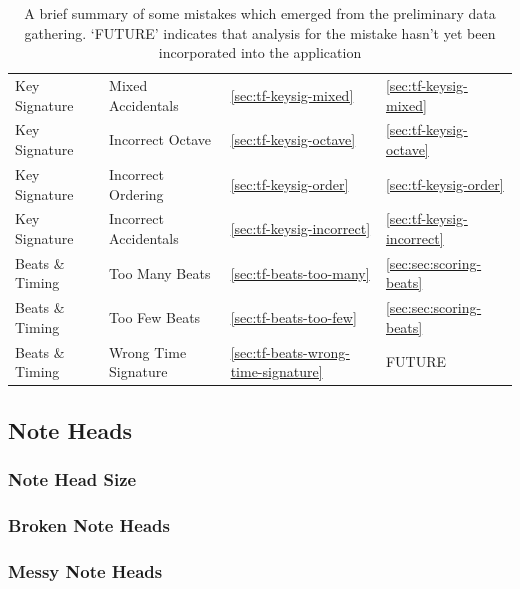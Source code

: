 \begin{table}[H]
\begin{tabularx}{\textwidth}{ llll }
        Key Signature   & Mixed Accidentals      & \cref{sec:tf-keysig-mixed}                & \cref{sec:tf-keysig-mixed} \\
        Key Signature   & Incorrect Octave       & \cref{sec:tf-keysig-octave}               & \cref{sec:tf-keysig-octave} \\
        Key Signature   & Incorrect Ordering     & \cref{sec:tf-keysig-order}                & \cref{sec:tf-keysig-order} \\
        Key Signature   & Incorrect Accidentals  & \cref{sec:tf-keysig-incorrect}            & \cref{sec:tf-keysig-incorrect} \\
        Beats \& Timing & Too Many Beats         & \cref{sec:tf-beats-too-many}              & \cref{sec:sec:scoring-beats}\\
        Beats \& Timing & Too Few Beats          & \cref{sec:tf-beats-too-few}               & \cref{sec:sec:scoring-beats}\\
        Beats \& Timing & Wrong Time Signature   & \cref{sec:tf-beats-wrong-time-signature}  & FUTURE \\

        \bottomrule
    \end{tabularx}
    \caption{A brief summary of some mistakes which emerged from the preliminary data gathering. `FUTURE' indicates that analysis for the mistake hasn't yet been incorporated into the application}
    \label{table:note-lengths}
\end{table}


\subsection{Note Heads}
\subsubsection{Note Head Size}\label{sec:tf-note-head-size}

\subsubsection{Broken Note Heads}\label{sec:tf-note-head-broken}

\subsubsection{Messy Note Heads}\label{sec:tf-note-head-messy}


